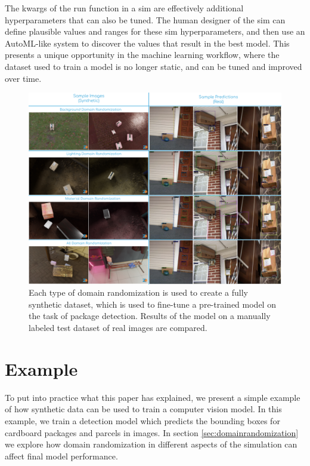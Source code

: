 \documentclass{article}
\begin{document}
The kwargs of the run function in a sim are effectively additional hyperparameters that can also be tuned. The human designer of the sim can define plausible values and ranges for these sim hyperparameters, and then use an AutoML-like system to discover the values that result in the best model. This presents a unique opportunity in the machine learning workflow, where the dataset used to train a model is no longer static, and can be tuned and improved over time.

\begin{figure}
	\centering
	\includegraphics[width=\textwidth]{results.png}
	\caption{Each type of domain randomization is used to create a fully synthetic dataset, which is used to fine-tune a pre-trained model on the task of package detection. Results of the model on a manually labeled test dataset of real images are compared.}
	\label{fig:results}
\end{figure}

\section{Example}
\label{sec:example}

To put into practice what this paper has explained, we present a simple example of how synthetic data can be used to train a computer vision model. In this example, we train a detection model which predicts the bounding boxes for cardboard packages and parcels in images. In section \ref{sec:domainrandomization} we explore how domain randomization in different aspects of the simulation can affect final model performance.
\end{document}

